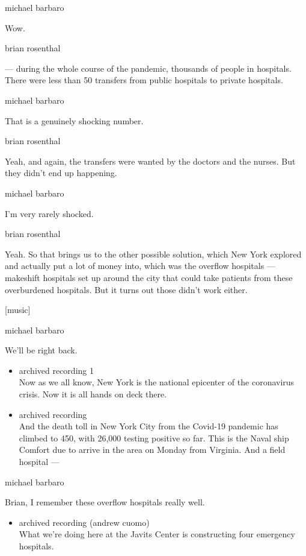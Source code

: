 michael barbaro

Wow.

brian rosenthal

--- during the whole course of the pandemic, thousands of people in
hospitals. There were less than 50 transfers from public hospitals to
private hospitals.

michael barbaro

That is a genuinely shocking number.

brian rosenthal

Yeah, and again, the transfers were wanted by the doctors and the
nurses. But they didn't end up happening.

michael barbaro

I'm very rarely shocked.

brian rosenthal

Yeah. So that brings us to the other possible solution, which New York
explored and actually put a lot of money into, which was the overflow
hospitals --- makeshift hospitals set up around the city that could take
patients from these overburdened hospitals. But it turns out those
didn't work either.

{[}music{]}

michael barbaro

We'll be right back.

\begin{itemize}
\item
  archived recording 1\\
  Now as we all know, New York is the national epicenter of the
  coronavirus crisis. Now it is all hands on deck there.
\item
  archived recording\\
  And the death toll in New York City from the Covid-19 pandemic has
  climbed to 450, with 26,000 testing positive so far. This is the Naval
  ship Comfort due to arrive in the area on Monday from Virginia. And a
  field hospital ---
\end{itemize}

michael barbaro

Brian, I remember these overflow hospitals really well.

\begin{itemize}
\tightlist
\item
  archived recording (andrew cuomo)\\
  What we're doing here at the Javits Center is constructing four
  emergency hospitals.
\end{itemize}

